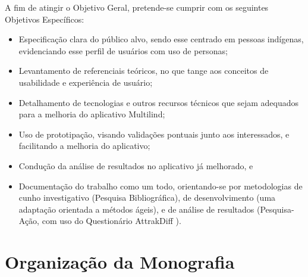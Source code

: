 \begin{description}
    \item A fim de atingir o Objetivo Geral, pretende-se cumprir com os seguintes Objetivos Específicos:
          \begin{itemize}
              \item Especificação clara do público alvo, sendo esse centrado em pessoas indígenas, evidenciando esse perfil de usuários com uso de personas;

              \item Levantamento de referenciais teóricos, no que tange aos conceitos de usabilidade e experiência de usuário;

              \item Detalhamento de tecnologias e outros recursos técnicos que sejam adequados para a melhoria do aplicativo Multilind;

              \item Uso de prototipação, visando validações pontuais junto aos interessados, e facilitando a melhoria do aplicativo;

              \item Condução da análise de resultados no aplicativo já melhorado, e
              
              \item Documentação do trabalho como um todo, orientando-se por metodologias de cunho investigativo (Pesquisa Bibliográfica), de desenvolvimento 
              (uma adaptação orientada a métodos ágeis), e de análise de resultados (Pesquisa-Ação, com uso do Questionário AttrakDiff \cite{natashatayana2015}
              \cite{hassenzahl2003}).
          \end{itemize}
\end{description}

\section{Organização da Monografia}
\label{sec:OrganizacaodaMonografia}

